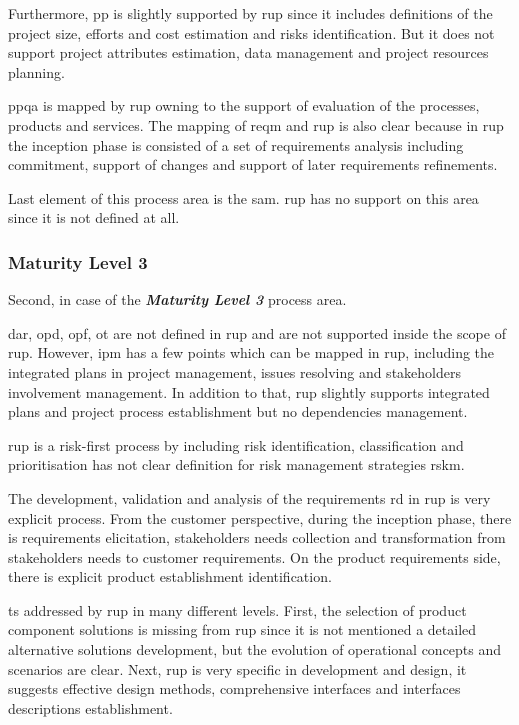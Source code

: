 Furthermore, \ac{pp} is slightly supported by \ac{rup} since it includes definitions of the project size, efforts and cost estimation and risks identification. But it does not support project attributes estimation, data management and project resources planning. 

\ac{ppqa} is mapped by \ac{rup} owning to the support of evaluation of the processes, products and services.
The mapping of \ac{reqm} and \ac{rup} is also clear because in \ac{rup} the inception phase is consisted of a set of requirements analysis including commitment, support of changes and support of later requirements refinements. 

Last element of this process area is the \ac{sam}. \ac{rup} has no support on this area since it is not defined at all.

\subsubsection{Maturity Level 3}
Second, in case of the \textbf{\textit{Maturity Level 3}} process area.

\ac{dar}, \ac{opd}, \ac{opf}, \ac{ot} are not defined in \ac{rup} and are not supported inside the scope of \ac{rup}. However, \ac{ipm} has a few points which can be mapped in \ac{rup}, including the integrated plans in project management, issues resolving and stakeholders involvement management. In addition to that, \ac{rup} slightly supports integrated plans and project process establishment but no dependencies management.

\ac{rup} is a risk-first process by including risk identification, classification and prioritisation has not clear definition for risk management strategies \ac{rskm}.

The development, validation and analysis of the requirements \ac{rd} in \ac{rup} is very explicit process. From the customer perspective, during the inception phase, there is requirements elicitation, stakeholders needs collection and  transformation from stakeholders needs to customer requirements. On the product requirements side, there is explicit product establishment identification.

\ac{ts} addressed by \ac{rup} in many different levels. First, the selection of product component solutions is missing from \ac{rup} since it is not mentioned a detailed alternative solutions development, but the evolution of operational concepts and scenarios are clear. Next, \ac{rup} is very specific in development and design, it suggests effective design methods, comprehensive interfaces and interfaces descriptions establishment.

